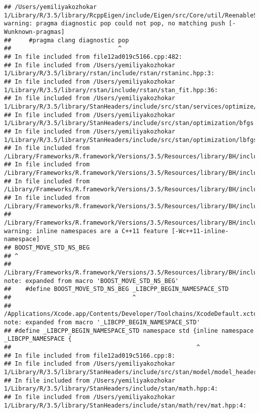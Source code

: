 \documentclass[]{article}
\begin{document}
\begin{verbatim}
## /Users/yemiliyakozhokar 1/Library/R/3.5/library/RcppEigen/include/Eigen/src/Core/util/ReenableStupidWarnings.h:10:30: warning: pragma diagnostic pop could not pop, no matching push [-Wunknown-pragmas]
##     #pragma clang diagnostic pop
##                              ^
## In file included from file12ad019c5166.cpp:482:
## In file included from /Users/yemiliyakozhokar 1/Library/R/3.5/library/rstan/include/rstan/rstaninc.hpp:3:
## In file included from /Users/yemiliyakozhokar 1/Library/R/3.5/library/rstan/include/rstan/stan_fit.hpp:36:
## In file included from /Users/yemiliyakozhokar 1/Library/R/3.5/library/StanHeaders/include/src/stan/services/optimize/bfgs.hpp:11:
## In file included from /Users/yemiliyakozhokar 1/Library/R/3.5/library/StanHeaders/include/src/stan/optimization/bfgs.hpp:9:
## In file included from /Users/yemiliyakozhokar 1/Library/R/3.5/library/StanHeaders/include/src/stan/optimization/lbfgs_update.hpp:6:
## In file included from /Library/Frameworks/R.framework/Versions/3.5/Resources/library/BH/include/boost/circular_buffer.hpp:54:
## In file included from /Library/Frameworks/R.framework/Versions/3.5/Resources/library/BH/include/boost/circular_buffer/details.hpp:20:
## In file included from /Library/Frameworks/R.framework/Versions/3.5/Resources/library/BH/include/boost/move/move.hpp:30:
## In file included from /Library/Frameworks/R.framework/Versions/3.5/Resources/library/BH/include/boost/move/iterator.hpp:27:
## /Library/Frameworks/R.framework/Versions/3.5/Resources/library/BH/include/boost/move/detail/iterator_traits.hpp:29:1: warning: inline namespaces are a C++11 feature [-Wc++11-inline-namespace]
## BOOST_MOVE_STD_NS_BEG
## ^
## /Library/Frameworks/R.framework/Versions/3.5/Resources/library/BH/include/boost/move/detail/std_ns_begin.hpp:18:34: note: expanded from macro 'BOOST_MOVE_STD_NS_BEG'
##    #define BOOST_MOVE_STD_NS_BEG _LIBCPP_BEGIN_NAMESPACE_STD
##                                  ^
## /Applications/Xcode.app/Contents/Developer/Toolchains/XcodeDefault.xctoolchain/usr/include/c++/v1/__config:390:52: note: expanded from macro '_LIBCPP_BEGIN_NAMESPACE_STD'
## #define _LIBCPP_BEGIN_NAMESPACE_STD namespace std {inline namespace _LIBCPP_NAMESPACE {
##                                                    ^
## In file included from file12ad019c5166.cpp:8:
## In file included from /Users/yemiliyakozhokar 1/Library/R/3.5/library/StanHeaders/include/src/stan/model/model_header.hpp:4:
## In file included from /Users/yemiliyakozhokar 1/Library/R/3.5/library/StanHeaders/include/stan/math.hpp:4:
## In file included from /Users/yemiliyakozhokar 1/Library/R/3.5/library/StanHeaders/include/stan/math/rev/mat.hpp:4:

\end{verbatim}
\end{document}
